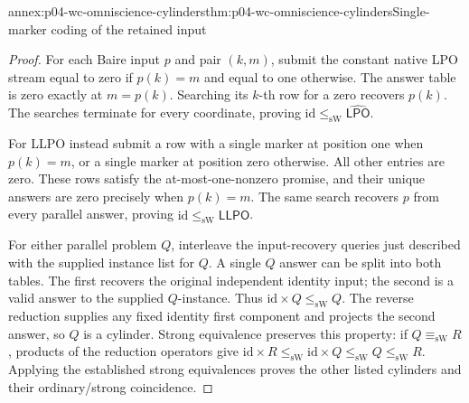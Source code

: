 \begin{annexitem}{annex:p04-wc-omniscience-cylinders}{thm:p04-wc-omniscience-cylinders}{Single-marker coding of the retained input}
\begin{proof}
For each Baire input \(p\) and pair \((k,m)\), submit the constant
native LPO stream equal to zero if \(p(k)=m\) and equal to one
otherwise. The answer table is zero exactly at \(m=p(k)\).
Searching its \(k\)-th row for a zero recovers \(p(k)\).
The searches terminate for every coordinate, proving
\(\mathrm{id}\leq_{\mathrm{sW}}\widehat{\mathsf{LPO}}\).

For LLPO instead submit a row with a single marker at position one
when \(p(k)=m\), or a single marker at position zero otherwise.
All other entries are zero. These rows satisfy the at-most-one-nonzero
promise, and their unique answers are zero precisely when \(p(k)=m\).
The same search recovers \(p\) from every parallel answer, proving
\(\mathrm{id}\leq_{\mathrm{sW}}\widehat{\mathsf{LLPO}}\).

For either parallel problem \(Q\), interleave the input-recovery
queries just described with the supplied instance list for \(Q\).
A single \(Q\) answer can be split into both tables. The first
recovers the original independent identity input; the second is a
valid answer to the supplied \(Q\)-instance. Thus
\(\mathrm{id}\times Q\leq_{\mathrm{sW}}Q\).
The reverse reduction supplies any fixed identity first component
and projects the second answer, so \(Q\) is a cylinder.
Strong equivalence preserves this property: if \(Q\equiv_{\mathrm{sW}}R\),
products of the reduction operators give
\(\mathrm{id}\times R\leq_{\mathrm{sW}}\mathrm{id}\times Q
\leq_{\mathrm{sW}}Q\leq_{\mathrm{sW}}R\).
Applying the established strong equivalences proves the other listed
cylinders and their ordinary/strong coincidence.
\end{proof}
\end{annexitem}

